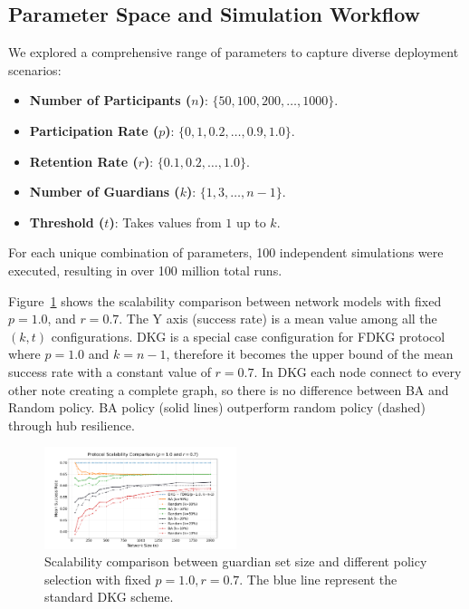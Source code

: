 \documentclass[lettersize,journal]{IEEEtran}
\theoremstyle{definition}
\begin{document}
\subsection{Parameter Space and Simulation Workflow}

We explored a comprehensive range of parameters to capture diverse deployment scenarios:
\begin{itemize}
    \item \textbf{Number of Participants ($n$)}: 
    $\{50, 100,200,\dots,1000\}$.
    \item \textbf{Participation Rate ($p$)}: $\{0,1, 0.2, \dots, 0.9, 1.0\}$.
    \item \textbf{Retention Rate ($r$)}: $\{0.1,0.2,\dots,1.0\}$.
    \item \textbf{Number of Guardians ($k$)}: $\{1,3,\dots,n-1\}$.
    \item \textbf{Threshold ($t$)}: Takes values from $1$ up to $k$.
\end{itemize}

For each unique combination of parameters, 100 independent simulations were executed, resulting in over 100 million total runs. 

Figure~\ref{fig:network_model} shows the scalability comparison between network models with fixed $p=1.0$, and $r=0.7$. The Y axis (success rate) is a mean value among all the $(k,t)$ configurations. DKG is a special case configuration for FDKG protocol where $p=1.0$ and $k=n-1$, therefore it becomes the upper bound of the mean success rate with a constant value of $r=0.7$. In DKG each node connect to every other note creating a complete graph, so there is no difference between BA and Random policy. BA policy (solid lines) outperform random policy (dashed) through hub resilience.


\begin{figure}[htbp]
    \centering
    \includegraphics[width=0.5\textwidth]{network_model_comparison.png}
        \caption{Scalability comparison between guardian set size and different policy selection with fixed $p=1.0, r=0.7$. The blue line represent the standard DKG scheme.}
    \label{fig:network_model}
\end{figure}
\end{document}
